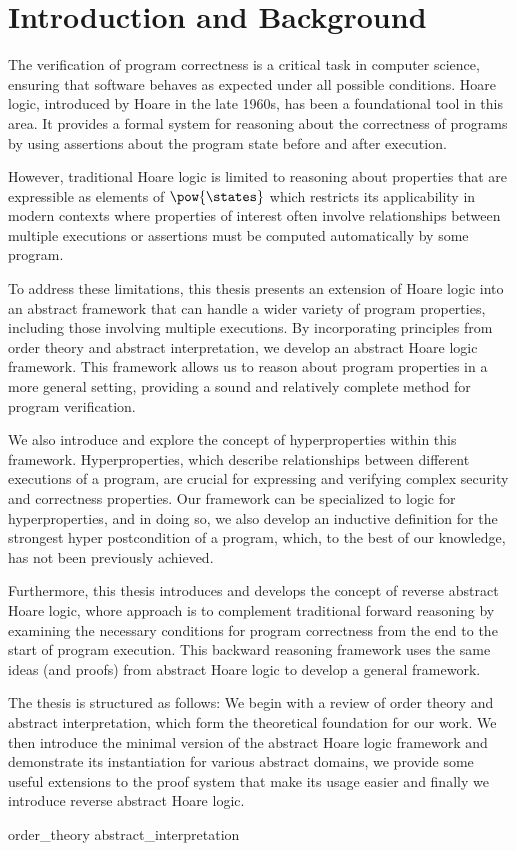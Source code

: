 \chapter{Introduction and Background}

The verification of program correctness is a critical task in computer science, 
ensuring that software behaves as expected under all possible conditions. 
Hoare logic, introduced by Hoare in the late 1960s, has been a foundational tool 
in this area. It provides a formal system for reasoning about the correctness of 
programs by using assertions about the program state before and after execution.

However, traditional Hoare logic is limited to reasoning about properties that
are expressible as elements of $\pow{\states}$ which restricts its applicability 
in modern contexts where properties of interest often involve relationships 
between multiple executions or assertions must be computed automatically by some 
program.

To address these limitations, this thesis presents an extension of Hoare logic 
into an abstract framework that can handle a wider variety of program properties, 
including those involving multiple executions. By incorporating principles from 
order theory and abstract interpretation, we develop an abstract Hoare logic 
framework. This framework allows us to reason about program properties in a more 
general setting, providing a sound and relatively complete method for program 
verification.

We also introduce and explore the concept of hyperproperties within this 
framework. Hyperproperties, which describe relationships between different 
executions of a program, are crucial for expressing and verifying complex 
security and correctness properties. Our framework can be specialized to logic 
for hyperproperties, and in doing so, we also develop an inductive definition 
for the strongest hyper postcondition of a program, which, to the best of our 
knowledge, has not been previously achieved.

Furthermore, this thesis introduces and develops the concept of reverse
abstract Hoare logic, whore approach is to complement traditional forward
reasoning by examining the necessary conditions for program correctness from
the end to the start of program execution. This backward reasoning framework
uses the same ideas (and proofs) from abstract Hoare logic to develop a general
framework.

The thesis is structured as follows: We begin with a review of order theory and 
abstract interpretation, which form the theoretical foundation for our work. We 
then introduce the minimal version of the abstract Hoare logic framework and 
demonstrate its instantiation for various abstract domains, we provide 
some useful extensions to the proof system that make its usage easier and 
finally we introduce reverse abstract Hoare logic.

{order_theory}
{abstract_interpretation}
